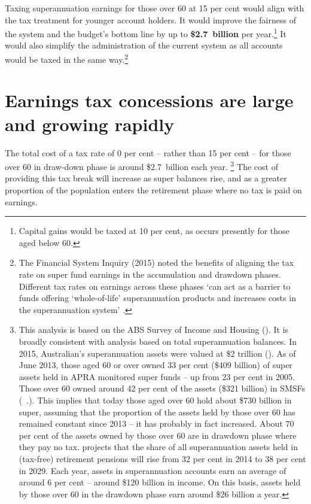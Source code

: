 Taxing superannuation earnings for those over 60 at 15 per cent would align with the tax treatment for younger account holders. It would improve the fairness of the system and the budget’s bottom line by up to \textbf{\$2.7~billion} per year.\footnote{Capital gains would be taxed at 10 per cent, as occurs presently for those aged below 60.}  It would also simplify the administration of the current system as all accounts would be taxed in the same way.\footnote{The \textcite[][140]{FinancialSystemsInquiry2015} Financial System Inquiry (2015) noted the benefits of aligning the tax rate on super fund earnings in the accumulation and drawdown phases. Different tax rates on earnings across these phases ‘can act as a barrier to funds offering ‘whole-of-life’ superannuation products and increases costs in the superannuation system’ \textcite[][140]{FinancialSystemsInquiry2015}. } 

\section{Earnings tax concessions are large and growing rapidly}\label{sec:SUPER-6-1}
The total cost of a tax rate of 0 per cent – rather than 15 per cent – for those over 60 in draw-down phase is around \$2.7~billion each year.%
\footnote{This analysis is based on the ABS Survey of Income and Housing (\textcite{ABS2015-Survey-of-income-and-housing-2013-14}). It is broadly consistent with analysis based on total superannuation balances. In 2015, Australian’s superannuation assets were valued at \$2 trillion (\textcites[][6]{APRA2015JuneSuperPerformance}[][7]{MinifieSavageCameron2015}). As of June 2013, those aged 60 or over owned 33 per cent (\$409 billion) of super assets held in APRA monitored super funds – up from 23 per cent in 2005. Those over 60 owned around 42 per cent of the assets (\$321 billion) in SMSFs (\gao\ \textcite{ATO2014e}.). This implies that today those aged over 60 hold about \$730 billion in super, assuming that the proportion of the assets held by those over 60 has remained constant since 2013 – it has probably in fact increased. About 70 per cent of the assets owned by those over 60 are in drawdown phase where they pay no tax. \textcite[][23]{RiceWarner2015SubmissionTaxWhitePaper} projects that the share of all superannuation assets held in (tax-free) retirement pensions will rise from 32 per cent in 2014 to 38 per cent in 2029. Each year, assets in superannuation accounts earn an average of around 6 per cent – around \$120 billion in income. On this basis, assets held by those over 60 in the drawdown phase earn around \$26 billion a year.}  The cost of providing this tax break will increase as super balances rise, and as a greater proportion of the population enters the retirement phase where no tax is paid on earnings. 

